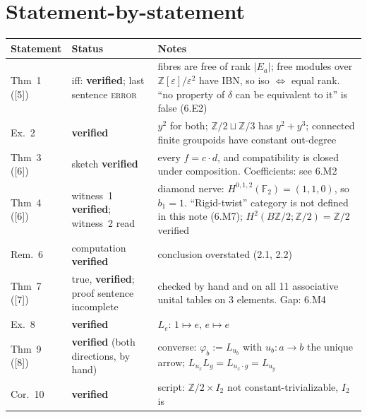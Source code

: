 \documentclass[11pt]{article}
\newcommand{\Z}{\mathbb{Z}}
\newcommand{\iss}[1]{\textsc{#1}}
\begin{document}
\section{Statement-by-statement}
\begin{center}\small
\begin{tabular}{p{2.5cm}p{3.2cm}p{9.6cm}}
\toprule
Statement & Status & Notes\\\midrule
Thm~1 ([5]) & iff: \textbf{verified}; last sentence \iss{error} & fibres are free of rank $|E_a|$; free modules over $\Z[\varepsilon]/\varepsilon^2$ have IBN, so iso $\Leftrightarrow$ equal rank. ``no property of $\delta$ can be equivalent to it'' is false (6.E2)\\
Ex.~2 & \textbf{verified} & $y^2$ for both; $\Z/2\sqcup\Z/3$ has $y^2+y^3$; connected finite groupoids have constant out-degree\\
Thm~3 ([6]) & sketch \textbf{verified} & every $f=c\cdot d$, and compatibility is closed under composition. Coefficients: see 6.M2\\
Thm~4 ([6]) & witness~1 \textbf{verified}; witness~2 read & diamond nerve: $H^{0,1,2}(\mathbb F_2)=(1,1,0)$, so $b_1=1$. ``Rigid-twist'' category is not defined in this note (6.M7); $H^2(B\Z/2;\Z/2)=\Z/2$ verified\\
Rem.~6 & computation \textbf{verified} & conclusion overstated (2.1, 2.2)\\
Thm~7 ([7]) & true, \textbf{verified}; proof sentence incomplete & checked by hand and on all 11 associative unital tables on 3 elements. Gap: 6.M4\\
Ex.~8 & \textbf{verified} & $L_e$: $1\mapsto e$, $e\mapsto e$\\
Thm~9 ([8]) & \textbf{verified} (both directions, by hand) & converse: $\varphi_b:=L_{u_b}$ with $u_b\colon a\to b$ the unique arrow; $L_{u_x}L_g=L_{u_x\cdot g}=L_{u_y}$\\
Cor.~10 & \textbf{verified} & script: $\Z/2\times I_2$ not constant-trivializable, $I_2$ is\\
\bottomrule
\end{tabular}
\end{center}
\end{document}
